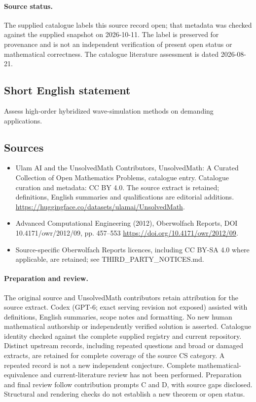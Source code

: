 \documentclass[11pt]{article}
\begin{document}
\paragraph{Source status.}
The supplied catalogue labels this source record open; that metadata was checked against the supplied snapshot on 2026-10-11. The label is preserved for provenance and is not an independent verification of present open status or mathematical correctness. The catalogue literature assessment is dated 2026-08-21.
\subsection{Short English statement}
Assess high-order hybridized wave-simulation methods on demanding applications.
\subsection{Sources}
\begin{itemize}
\item[S1] Ulam AI and the UnsolvedMath Contributors, UnsolvedMath: A Curated Collection of Open Mathematics Problems, catalogue entry. Catalogue curation and metadata: CC BY 4.0. The source extract is retained; definitions, English summaries and qualifications are editorial additions.
\url{https://huggingface.co/datasets/ulamai/UnsolvedMath}.
\item[S2] Advanced Computational Engineering (2012), Oberwolfach Reports, DOI 10.4171/owr/2012/09, pp. 457--553
\url{https://doi.org/10.4171/owr/2012/09}.
\item Source-specific Oberwolfach Reports licences, including CC BY-SA 4.0 where applicable, are retained; see THIRD\_PARTY\_NOTICES.md.
\end{itemize}
\paragraph{Preparation and review.}
The original source and UnsolvedMath contributors retain attribution for the source extract. Codex (GPT-6; exact serving revision not exposed) assisted with definitions, English summaries, scope notes and formatting. No new human mathematical authorship or independently verified solution is asserted. Catalogue identity checked against the complete supplied registry and current repository. Distinct upstream records, including repeated questions and broad or damaged extracts, are retained for complete coverage of the source CS category. A repeated record is not a new independent conjecture. Complete mathematical-equivalence and current-literature review has not been performed. Preparation and final review follow contribution prompts C and D, with source gaps disclosed. Structural and rendering checks do not establish a new theorem or open status.
\label{end:statement}
\end{document}
